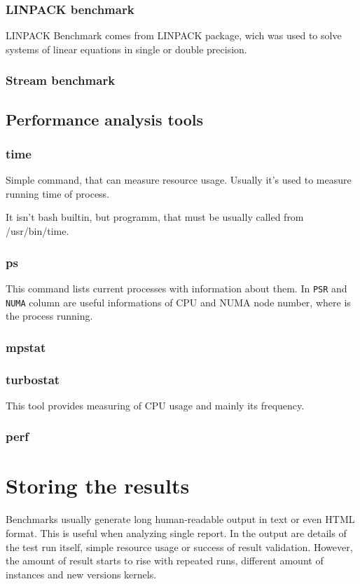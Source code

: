 \subsection{LINPACK benchmark}
LINPACK Benchmark comes from LINPACK package, wich was used to solve systems of linear equations in single or double precision.

\subsection{Stream benchmark}

\section{Performance analysis tools}

\subsection{time}
Simple command, that can measure resource usage. Usually it's used to measure
running time of process.

It isn't bash builtin, but programm, that must be usually called from /usr/bin/time.

\subsection{ps}
This command lists current processes with information about them. In
\texttt{PSR} and \texttt{NUMA} column are useful informations of CPU and NUMA
node number, where is the process running.

\subsection{mpstat}

\subsection{turbostat}
This tool provides measuring of CPU usage and mainly its frequency.

\subsection{perf}


\chapter{Storing the results}
Benchmarks usually generate long human-readable output in text or even HTML
format. This is useful when analyzing single report. In the output are details
of the test run itself, simple resource usage or success of result validation.
However, the amount of result starts to rise with repeated runs, different
amount of instances and new versions kernels.

